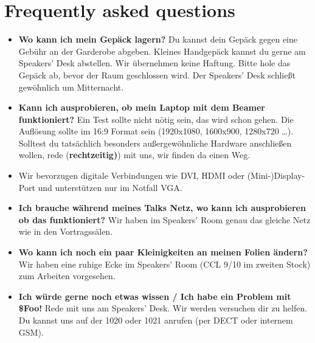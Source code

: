 \documentclass[paper=a4]{scrartcl}
\begin{document}
\section*{Frequently asked questions}
\begin{itemize}
	\item \textbf{Wo kann ich mein Gepäck lagern?} Du kannst dein Gepäck gegen eine Gebühr an der Garderobe abgeben. Kleines Handgepäck kannst du gerne am Speakers' Desk abstellen. Wir übernehmen keine Haftung. Bitte hole das Gepäck ab, bevor der Raum geschlossen wird. Der Speakers' Desk schließt gewöhnlich um Mitternacht.
	\item \textbf{Kann ich ausprobieren, ob mein Laptop mit dem Beamer funktioniert?} Ein Test sollte nicht nötig sein, das wird schon gehen. Die Auflösung sollte im 16:9 Format sein (1920x1080, 1600x900, 1280x720 \ldots). Solltest du tatsächlich besonders außergewöhnliche Hardware anschließen wollen, rede (\textbf{rechtzeitig)}) mit uns, wir finden da einen Weg.
	\item Wir bevorzugen digitale Verbindungen wie DVI, HDMI oder (Mini-)Display-Port und unterstützen nur im Notfall VGA.
	\item \textbf{Ich brauche während meines Talks Netz, wo kann ich ausprobieren ob das funktioniert?} Wir haben im Speakers' Room genau das gleiche Netz wie in den Vortragssälen.
	\item \textbf{Wo kann ich noch ein paar Kleinigkeiten an meinen Folien ändern?}
	 Wir haben eine ruhige Ecke im Speakers' Room (CCL 9/10 im zweiten Stock) zum Arbeiten vorgesehen.
	\item \textbf{Ich würde gerne noch etwas wissen / Ich habe ein Problem mit \$Foo!} Rede mit uns am Speakers' Desk. Wir werden versuchen dir zu helfen. Du kannst uns auf der 1020 oder 1021 anrufen (per DECT oder internem GSM).
\end{itemize}
\end{document}
